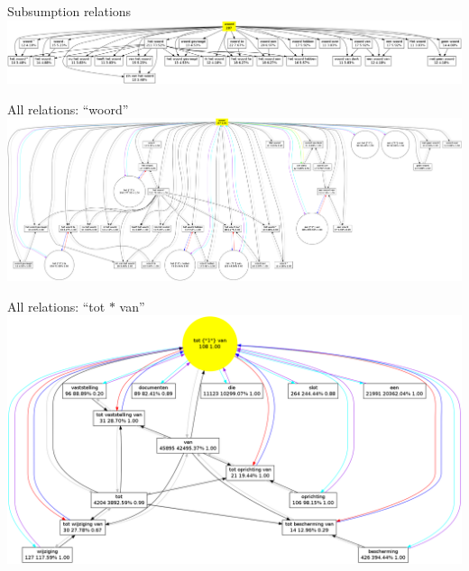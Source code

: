 \documentclass[compress]{beamer}
\begin{document}
\begin{frame}{Subsumption relations}
  \includegraphics[width=160.0mm]{graph_woord_P.png}
\end{frame}


\begin{frame}{All relations: ``woord''}
 \includegraphics[width=170.0mm]{graph_woord_all.png}
\end{frame}

\begin{frame}{All relations: ``tot $*$ van''}
 \includegraphics[width=140.0mm]{graph_totvan_all.png}
\end{frame}


\end{document}
